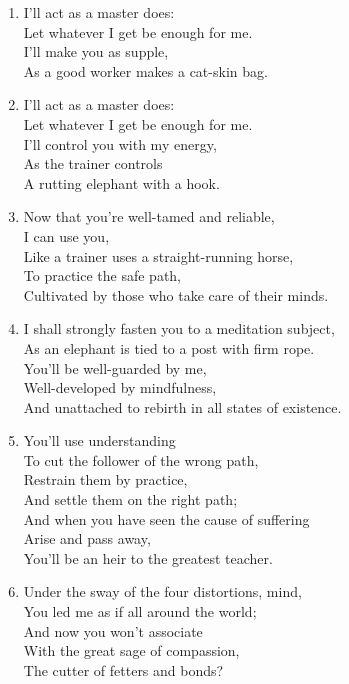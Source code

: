 \documentclass[10pt, openany]{book}
\begin{document}
\begin{enumerate}
\item I’ll act as a master does:\\
Let whatever I get be enough for me.\\
I’ll make you as supple,\\
As a good worker makes a cat-skin bag.

\item I’ll act as a master does:\\
Let whatever I get be enough for me.\\
I’ll control you with my energy,\\
As the trainer controls \\
A rutting elephant with a hook.

\item Now that you’re well-tamed and reliable,\\
I can use you, \\
Like a trainer uses a straight-running horse,\\
To practice the safe path,\\
Cultivated by those who take care of their minds.

\item I shall strongly fasten you to a meditation subject,\\
As an elephant is tied to a post with firm rope.\\
You’ll be well-guarded by me, \\
Well-developed by mindfulness,\\
And unattached to rebirth in all states of existence.

\item You’ll use understanding \\
To cut the follower of the wrong path,\\
Restrain them by practice, \\
And settle them on the right path;\\
And when you have seen the cause of suffering \\
Arise and pass away,\\
You’ll be an heir to the greatest teacher.

\item Under the sway of the four distortions, mind,\\
You led me as if all around the world;\\
And now you won’t associate \\
With the great sage of compassion,\\
The cutter of fetters and bonds?


\end{enumerate}
\end{document}
